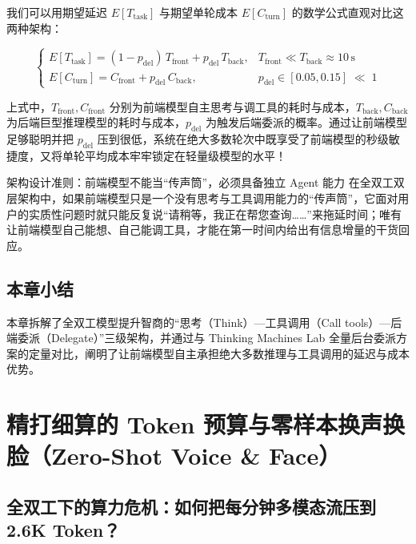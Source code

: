 \documentclass[a4paper]{article}
\begin{document}
我们可以用期望延迟 $E[T_{\mathrm{task}}]$ 与期望单轮成本 $E[C_{\mathrm{turn}}]$ 的数学公式直观对比这两种架构：

\begin{equation}
\begin{cases}
E[T_{\mathrm{task}}] = (1 - p_{\mathrm{del}})\,T_{\mathrm{front}} + p_{\mathrm{del}}\,T_{\mathrm{back}}, & T_{\mathrm{front}} \ll T_{\mathrm{back}} \approx 10\,\mathrm{s} \\[6pt]
E[C_{\mathrm{turn}}] = C_{\mathrm{front}} + p_{\mathrm{del}}\,C_{\mathrm{back}}, & p_{\mathrm{del}} \in [0.05, 0.15] \;\ll\; 1
\end{cases}
\end{equation}

上式中，$T_{\mathrm{front}}, C_{\mathrm{front}}$ 分别为前端模型自主思考与调工具的耗时与成本，$T_{\mathrm{back}}, C_{\mathrm{back}}$ 为后端巨型推理模型的耗时与成本，$p_{\mathrm{del}}$ 为触发后端委派的概率。通过让前端模型足够聪明并把 $p_{\mathrm{del}}$ 压到很低，系统在绝大多数轮次中既享受了前端模型的秒级敏捷度，又将单轮平均成本牢牢锁定在轻量级模型的水平！

\begin{importantbox}{架构设计准则：前端模型不能当“传声筒”，必须具备独立 Agent 能力}
在全双工双层架构中，如果前端模型只是一个没有思考与工具调用能力的“传声筒”，它面对用户的实质性问题时就只能反复说“请稍等，我正在帮您查询……”来拖延时间；唯有让前端模型自己能想、自己能调工具，才能在第一时间内给出有信息增量的干货回应。
\end{importantbox}

\subsection{本章小结}

本章拆解了全双工模型提升智商的“思考（Think）—工具调用（Call tools）—后端委派（Delegate）”三级架构，并通过与 Thinking Machines Lab 全量后台委派方案的定量对比，阐明了让前端模型自主承担绝大多数推理与工具调用的延迟与成本优势。

\section{精打细算的 Token 预算与零样本换声换脸（Zero-Shot Voice \& Face）}

\subsection{全双工下的算力危机：如何把每分钟多模态流压到 2.6K Token？}
\end{document}
